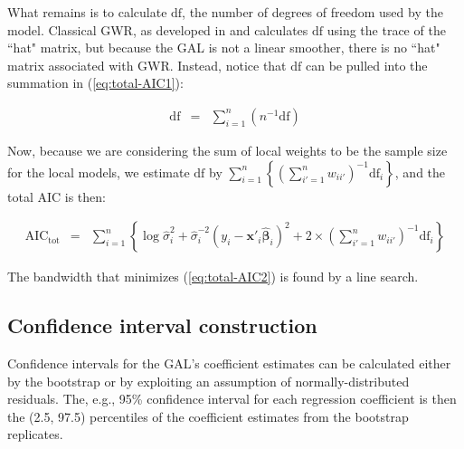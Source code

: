 \documentclass[authoryear, review, 11pt]{elsarticle}
\begin{document}
	What remains is to calculate $\mbox{df}$, the number of degrees of freedom used by the model. Classical GWR, as developed in \cite{Loader:1999} and \cite{Fotheringham:2002} calculates $\mbox{df}$ using the trace of the ``hat" matrix, but because the GAL is not a linear smoother, there is no ``hat" matrix associated with GWR. Instead, notice that $\mbox{df}$ can be pulled into the summation in (\ref{eq:total-AIC1}):
		
			
	\begin{eqnarray}
		\mbox{df} &=& \sum_{i=1}^n \left( n^{-1} \mbox{df} \right)
	\end{eqnarray}
	
	Now, because we are considering the sum of local weights to be the sample size for the local models, we estimate $\mbox{df}$ by $\sum_{i=1}^n \left\{ \left(\sum_{i'=1}^n w_{ii'} \right)^{-1} \mbox{df}_i \right\}$, and the total AIC is then:
	
	\begin{eqnarray}\label{eq:total-AIC2}
		\mbox{AIC}_{\mbox{tot}} &=& \sum_{i=1}^n \left\{ \log \hat{\sigma}_i^2 + \hat{\sigma}_i^{-2} \left(y_i - \bm{x}'_i \hat{\bm{\beta}}_i \right)^2 + 2 \times \left(\sum_{i'=1}^n w_{ii'} \right)^{-1} \mbox{df}_i \right\}
	\end{eqnarray}
			
	The bandwidth that minimizes (\ref{eq:total-AIC2}) is found by a line search.\\
	
	\subsection{Confidence interval construction}	
	Confidence intervals for the GAL's coefficient estimates can be calculated either by the bootstrap \citep{Efron:1986} or by exploiting an assumption of normally-distributed residuals. The, e.g., 95\% confidence interval for each regression coefficient is then the (2.5, 97.5) percentiles of the coefficient estimates from the bootstrap replicates.\\
	 
\end{document}
